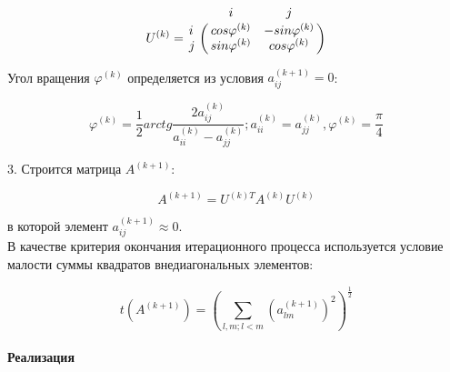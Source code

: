 $$
U^{(k)} = \bordermatrix{
~ & i & j \cr
i & cos \varphi^{(k)} & -sin \varphi^{(k)} \cr
j & sin \varphi^{(k)} & cos \varphi^{(k)}
}
$$

Угол вращения $\varphi^{(k)}$ определяется из условия $a_{ij}^{(k+1)}=0$:

$$
\varphi^{(k)}=\frac{1}{2}arctg\frac{2a_{ij}^{(k)}}{a_{ii}^{(k)}-a_{jj}^{(k)}}; a_{ii}^{(k)}=a_{jj}^{(k)}, \varphi^{(k)}=\frac{\pi}{4}
$$

3. Строится матрица $A^{(k+1)}$:

$$
A^{(k+1)}=U^{(k)T}A^{(k)}U^{(k)}
$$

в которой элемент $a_{ij}^{(k+1)} \approx 0$.\\

В качестве критерия окончания итерационного процесса используется условие малости суммы квадратов внедиагональных элементов:

$$
t(A^{(k+1)})=(\sum_{l,m;l<m}(a_{lm}^{(k+1)})^2)^\frac{1}{2}
$$\\

\textbf{Реализация}

